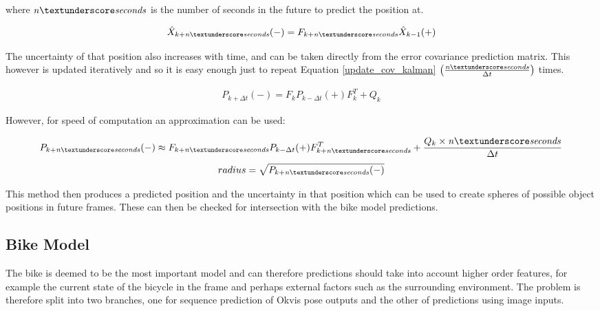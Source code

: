 \documentclass[11pt,twoside]{report}
\begin{document}
where $\mathit{n \textunderscore seconds}$ is the number of seconds in the future to predict the position at.

\begin{equation}
\begin{aligned}
\hat{X}_{k+\mathit{n \textunderscore seconds}}(-) =  F_{k+\mathit{n \textunderscore seconds}} \hat{X}_{k-1}(+)
\end{aligned}
\end{equation}

The uncertainty of that position also increases with time, and can be taken directly from the error covariance prediction matrix. This however is updated iteratively and so it is easy enough just to repeat Equation \ref{update_cov_kalman} $ \big (\frac{\mathit{n \textunderscore seconds}}{\Delta t} \big )$ times.

\begin{equation}
\begin{aligned}
P_{k+ \Delta t}(-) = F_{k} P_{k- \Delta t}(+) F_{k}^{T} + Q_{k}
\end{aligned}
\label{update_cov_kalman}
\end{equation}

However, for speed of computation an approximation can be used:

\begin{equation}
P_{k+ \mathit{n \textunderscore seconds}}(-) \approx F_{k + \mathit{n \textunderscore seconds}} P_{k- \Delta t}(+) F_{k + \mathit{n \textunderscore seconds}}^{T} + \frac{Q_{k} \times \mathit{n \textunderscore seconds}} {\Delta t}
\end{equation}
\begin{equation}
radius = \sqrt{P_{k+ \mathit{n \textunderscore seconds}}(-)}
\label{cov_kalman_approx}
\end{equation}

This method then produces a predicted position and the uncertainty in that position which can be used to create spheres of possible object positions in future frames. These can then be checked for intersection with the bike model predictions. 



\subsection{Bike Model} \label{bike_model}

The bike is deemed to be the most important model and can therefore predictions should take into account higher order features, for example the current state of the bicycle in the frame and perhaps external factors such as the surrounding environment. The problem is therefore split into two branches, one for sequence prediction of Okvis pose outputs and the other of predictions using image inputs.
\end{document}
